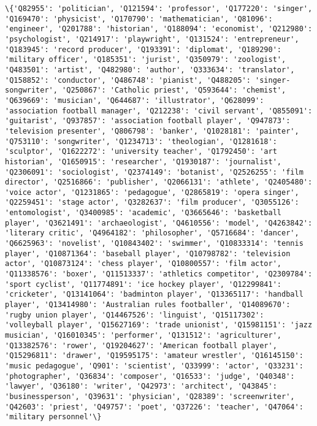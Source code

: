 \documentclass[11pt]{article}
\begin{document}
    \begin{Verbatim}[commandchars=\\\{\}]
\{'Q82955': 'politician', 'Q121594': 'professor', 'Q177220': 'singer', 'Q169470': 'physicist', 'Q170790': 'mathematician', 'Q81096': 'engineer', 'Q201788': 'historian', 'Q188094': 'economist', 'Q212980': 'psychologist', 'Q214917': 'playwright', 'Q131524': 'entrepreneur', 'Q183945': 'record producer', 'Q193391': 'diplomat', 'Q189290': 'military officer', 'Q185351': 'jurist', 'Q350979': 'zoologist', 'Q483501': 'artist', 'Q482980': 'author', 'Q333634': 'translator', 'Q158852': 'conductor', 'Q486748': 'pianist', 'Q488205': 'singer-songwriter', 'Q250867': 'Catholic priest', 'Q593644': 'chemist', 'Q639669': 'musician', 'Q644687': 'illustrator', 'Q628099': 'association football manager', 'Q212238': 'civil servant', 'Q855091': 'guitarist', 'Q937857': 'association football player', 'Q947873': 'television presenter', 'Q806798': 'banker', 'Q1028181': 'painter', 'Q753110': 'songwriter', 'Q1234713': 'theologian', 'Q1281618': 'sculptor', 'Q1622272': 'university teacher', 'Q1792450': 'art historian', 'Q1650915': 'researcher', 'Q1930187': 'journalist', 'Q2306091': 'sociologist', 'Q2374149': 'botanist', 'Q2526255': 'film director', 'Q2516866': 'publisher', 'Q2066131': 'athlete', 'Q2405480': 'voice actor', 'Q1231865': 'pedagogue', 'Q2865819': 'opera singer', 'Q2259451': 'stage actor', 'Q3282637': 'film producer', 'Q3055126': 'entomologist', 'Q3400985': 'academic', 'Q3665646': 'basketball player', 'Q3621491': 'archaeologist', 'Q4610556': 'model', 'Q4263842': 'literary critic', 'Q4964182': 'philosopher', 'Q5716684': 'dancer', 'Q6625963': 'novelist', 'Q10843402': 'swimmer', 'Q10833314': 'tennis player', 'Q10871364': 'baseball player', 'Q10798782': 'television actor', 'Q10873124': 'chess player', 'Q10800557': 'film actor', 'Q11338576': 'boxer', 'Q11513337': 'athletics competitor', 'Q2309784': 'sport cyclist', 'Q11774891': 'ice hockey player', 'Q12299841': 'cricketer', 'Q13141064': 'badminton player', 'Q13365117': 'handball player', 'Q13414980': 'Australian rules footballer', 'Q14089670': 'rugby union player', 'Q14467526': 'linguist', 'Q15117302': 'volleyball player', 'Q15627169': 'trade unionist', 'Q15981151': 'jazz musician', 'Q16010345': 'performer', 'Q131512': 'agriculturer', 'Q13382576': 'rower', 'Q19204627': 'American football player', 'Q15296811': 'drawer', 'Q19595175': 'amateur wrestler', 'Q16145150': 'music pedagogue', 'Q901': 'scientist', 'Q33999': 'actor', 'Q33231': 'photographer', 'Q36834': 'composer', 'Q16533': 'judge', 'Q40348': 'lawyer', 'Q36180': 'writer', 'Q42973': 'architect', 'Q43845': 'businessperson', 'Q39631': 'physician', 'Q28389': 'screenwriter', 'Q42603': 'priest', 'Q49757': 'poet', 'Q37226': 'teacher', 'Q47064': 'military personnel'\}

    \end{Verbatim}
\end{document}
